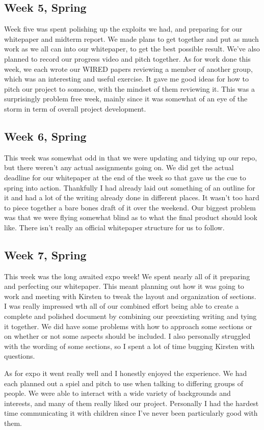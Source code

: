 \documentclass[IEEEtran,letterpaper,10pt,notitlepage,draftclsnofoot,onecolumn]{article}
\begin{document}
\subsection{Week 5, Spring}
Week five was spent polishing up the exploits we had, and preparing for our whitepaper and midterm report. We made plans to get together and put as much work as we all can into our whitepaper, to get the best possible result. We've also planned to record our progress video and pitch together. As for work done this week, we each wrote our WIRED papers reviewing a member of another group, which was an interesting and useful exercise. It gave me good ideas for how to pitch our project to someone, with the mindset of them reviewing it. This was a surprisingly problem free week, mainly since it was somewhat of an eye of the storm in term of overall project development.
\subsection{Week 6, Spring}
This week was somewhat odd in that we were updating and tidying up our repo, but there weren't any actual assignments going on. We did get the actual deadline for our whitepaper at the end of the week so that gave us the cue to spring into action. Thankfully I had already laid out something of an outline for it and had a lot of the writing already done in different places. It wasn't too hard to piece together a bare bones draft of it over the weekend. Our biggest problem was that we were flying somewhat blind as to what the final product should look like. There isn't really an official whitepaper structure for us to follow.
\subsection{Week 7, Spring}
This week was the long awaited expo week! We spent nearly all of it preparing and perfecting our whitepaper. This meant planning out how it was going to work and meeting with Kirsten to tweak the layout and organization of sections. I was really impressed wth all of our combined effort being able to create a complete and polished document by combining our preexisting writing and tying it together. We did have some problems with how to approach some sections or on whether or not some aspects should be included. I also personally struggled with the wording of some sections, so I spent a lot of time bugging Kirsten with questions.

As for expo it went really well and I honestly enjoyed the experience. We had each planned out a spiel and pitch to use when talking to differing groups of people. We were able to interact with a wide variety of backgrounds and interests, and many of them really liked our project. Personally I had the hardest time communicating it with children since I've never been particularly good with them.
\end{document}
